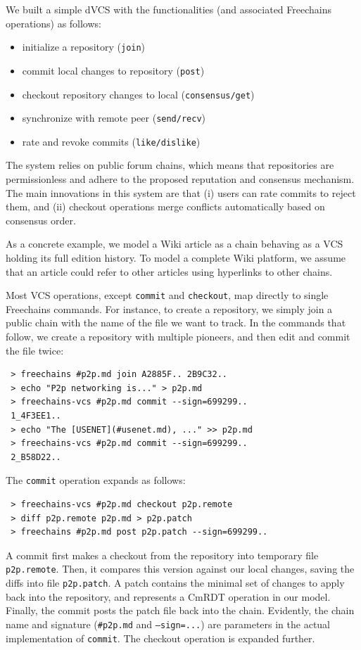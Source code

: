 \documentclass[10pt,journal,compsoc]{IEEEtran}
\newcommand{\FC}       {Freechains\xspace}
\newcommand{\code}[1]  {\texttt{\footnotesize{#1}}}
\begin{document}
We built a simple dVCS with the functionalities (and associated \FC
operations) as follows:
%
\begin{itemize}
    \setlength{\itemindent}{-8pt}
    \item initialize a repository (\code{join})
    \item commit local changes to repository (\code{post})
    \item checkout repository changes to local (\code{consensus/get})
    \item synchronize with remote peer (\code{send/recv})
    \item rate and revoke commits (\code{like/dislike})
\end{itemize}
%
The system relies on public forum chains, which means that repositories are
permissionless and adhere to the proposed reputation and consensus mechanism.
The main innovations in this system are that
    (i)  users can rate commits to reject them, and
    (ii) checkout operations merge conflicts automatically based on consensus
         order.

As a concrete example, we model a Wiki article as a chain behaving as a VCS
holding its full edition history.
To model a complete Wiki platform, we assume that an article could refer to
other articles using hyperlinks to other chains.

Most VCS operations, except \code{commit} and \code{checkout}, map directly to
single \FC commands.
For instance, to create a repository, we simply join a public chain with the
name of the file we want to track.
In the commands that follow, we create a repository with multiple pioneers, and
then edit and commit the file twice:

{\footnotesize
\begin{verbatim}
 > freechains #p2p.md join A2885F.. 2B9C32..
 > echo "P2p networking is..." > p2p.md
 > freechains-vcs #p2p.md commit --sign=699299..
 1_4F3EE1..
 > echo "The [USENET](#usenet.md), ..." >> p2p.md
 > freechains-vcs #p2p.md commit --sign=699299..
 2_B58D22..
\end{verbatim}
}

The \code{commit} operation expands as follows:

{\footnotesize
\begin{verbatim}
 > freechains-vcs #p2p.md checkout p2p.remote
 > diff p2p.remote p2p.md > p2p.patch
 > freechains #p2p.md post p2p.patch --sign=699299..
\end{verbatim}
}

A commit first makes a checkout from the repository into temporary file
\code{p2p.remote}.
Then, it compares this version against our local changes, saving the diffs
into file \code{p2p.patch}.
A patch contains the minimal set of changes to apply back into the repository,
and represents a CmRDT operation in our model.
Finally, the commit posts the patch file back into the chain.
Evidently, the chain name and signature (\code{\#p2p.md} and \code{--sign=...})
are parameters in the actual implementation of \code{commit}.
The checkout operation is expanded further.
\end{document}
